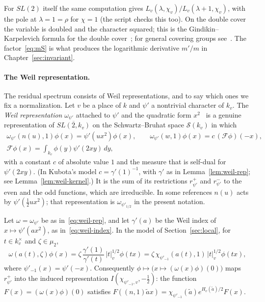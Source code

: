 For $SL(2)$ itself the same computation gives
$L_v(\lambda,\chi_v)/L_v(\lambda+1,\chi_v)$, with the pole at
$\lambda=1=\rho$ for $\chi=1$ (the script checks this too). On the double
cover the variable is doubled and the character squared; this is the
Gindikin--Karpelevich formula for the double cover~\cite{KP84}; for
general covering groups see~\cite{Mc12,Ga14}. The factor~\eqref{eq:mS} is
what produces the logarithmic derivative $m'/m$ in Chapter~\ref{sec:invariant}.

\paragraph{The Weil representation.} The residual spectrum consists of
Weil representations, and to say which ones we fix a normalization. Let
$v$ be a place of $k$ and $\psi'$ a nontrivial character of $k_v$. The
\emph{Weil representation} $\omega_{\psi'}$ attached to $\psi'$ and the
quadratic form $x^2$~\cite{We64,Ge76} is a genuine representation of
$\overline{SL(2,k_v)}$ on the Schwartz--Bruhat space $\mathcal S(k_v)$ in
which
\begin{equation}\label{eq:weil-rep}
\begin{gathered}
\omega_{\psi'}(n(u),1)\phi(x)=\psi'(ux^2)\phi(x),\qquad
\omega_{\psi'}(w,1)\phi(x)=c\,(\mathcal F\phi)(-x),\\
\mathcal F\phi(x)=\int_{k_v}\phi(y)\psi'(2xy)\,dy,
\end{gathered}
\end{equation}
with a constant $c$ of absolute value $1$ and the measure that is
self-dual for $\psi'(2xy)$. (In Kubota's model $c=\gamma'(1)^{-1}$, with
$\gamma'$ as in Lemma~\ref{lem:weil-rep}; see Lemma~\ref{lem:weil-kernel}.)
It is the sum of its restrictions
$r^+_{\psi'}$ and $r^-_{\psi'}$ to the even and the odd functions, which
are irreducible. In some references $n(u)$ acts by $\psi'(\frac12ux^2)$;
that representation is $\omega_{\psi'_{1/2}}$ in the present notation.

\begin{lemma}\label{lem:weil-rep}
Let $\omega=\omega_{\psi'}$ be as in~\eqref{eq:weil-rep}, and let
$\gamma'(a)$ be the Weil index of $x\mapsto\psi'(ax^2)$, as
in~\eqref{eq:weil-index}. In the model of Section~\ref{sec:local}, for
$t\in k_v^\times$ and $\zeta\in\mu_2$,
\[
\omega(a(t),\zeta)\phi(x)=\zeta\,\frac{\gamma'(1)}{\gamma'(t)}\,
|t|_v^{1/2}\phi(tx)=\zeta\,\chi_{\psi'_{-1}}(a(t),1)\,|t|_v^{1/2}\phi(tx),
\]
where $\psi'_{-1}(x)=\psi'(-x)$. Consequently $\phi\mapsto\bigl(x\mapsto
(\omega(x)\phi)(0)\bigr)$ maps $r^+_{\psi'}$ into the induced
representation $I(\chi_{\psi'_{-1},v},-\frac12)$: the function
$F(x)=(\omega(x)\phi)(0)$ satisfies $F((n,1)\tilde ax)=\chi_{\psi'_{-1}}
(\tilde a)e^{H_v(\tilde a)/2}F(x)$.
\end{lemma}

